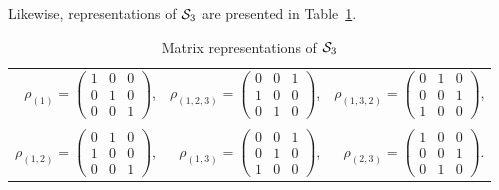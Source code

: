	\begin{example}\label{ex:permS3}
		Likewise, representations of $\mathcal{S}_3$ are presented in Table~\ref{table:permS3}.
		\begin{table}[hbt!]
			\centering
			\begin{tabular}{r r r}
				$\rho_{(1)} = 
				\begin{pmatrix}
					1 & 0 & 0 \\
					0 & 1 & 0 \\
					0 & 0 & 1
				\end{pmatrix}$, & 
				$\rho_{(1,2,3)} = 
				\begin{pmatrix}
					0 & 0 & 1 \\
					1 & 0 & 0 \\
					0 & 1 & 0
				\end{pmatrix}$, & 
				$\rho_{(1,3,2)} = 
				\begin{pmatrix}
					0 & 1 & 0 \\
					0 & 0 & 1 \\
					1 & 0 & 0
				\end{pmatrix}$, \\ & & \\
				$\rho_{(1,2)} = 
				\begin{pmatrix}
					0 & 1 & 0 \\
					1 & 0 & 0 \\
					0 & 0 & 1
				\end{pmatrix}$, &
				$\rho_{(1,3)} = 
				\begin{pmatrix}
					0 & 0 & 1 \\
					0 & 1 & 0 \\
					1 & 0 & 0
				\end{pmatrix}$, &
				$\rho_{(2,3)} = 
				\begin{pmatrix}
					1 & 0 & 0 \\
					0 & 0 & 1 \\
					0 & 1 & 0
				\end{pmatrix}$.
			\end{tabular}
			\caption{Matrix representations of $\mathcal{S}_3$}
			\label{table:permS3}
		\end{table}
	\end{example}
	
